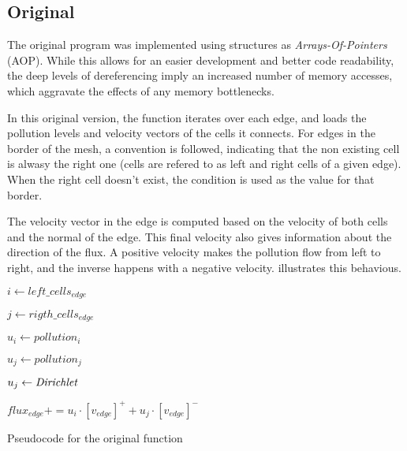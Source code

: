 \subsection{Original}
\label{sec:310}

The original \polu program was implemented using structures as \textit{Arrays-Of-Pointers} (AOP). While this allows for an easier development and better code readability, the deep levels of dereferencing imply an increased number of memory accesses, which aggravate the effects of any memory bottlenecks.

In this original version, the \computeflux function iterates over each edge, and loads the pollution levels and velocity vectors of the cells it connects. For edges in the border of the mesh, a convention is followed, indicating that the non existing cell is alwasy the right one (cells are refered to as left and right cells of a given edge). When the right cell doesn't exist, the \dirichlet condition is used as the value for that border.

The velocity vector in the edge is computed based on the velocity of both cells and the normal of the edge. This final velocity also gives information about the direction of the flux. A positive velocity makes the pollution flow from left to right, and the inverse happens with a negative velocity.  illustrates this behavious.



\begin{algorithm}[!htp]
	\begin{algorithmic}

			$i     \gets left\_cells_{edge}$

			$j     \gets rigth\_cells_{edge}$

			$u_{i} \gets pollution_{i}$


				$u_{j} \gets pollution_{j}$
			\Else

				$u_{j} \gets \textit{Dirichlet}$
			\EndIf


			$flux_{edge} += u_{i} \cdot [v_{edge}]^{+} + u_{j} \cdot [v_{edge}]^{-}$
		\EndFor
	\end{algorithmic}

	\caption{Pseudocode for the original \computeflux function}
	\label{alg:flux}
\end{algorithm}

